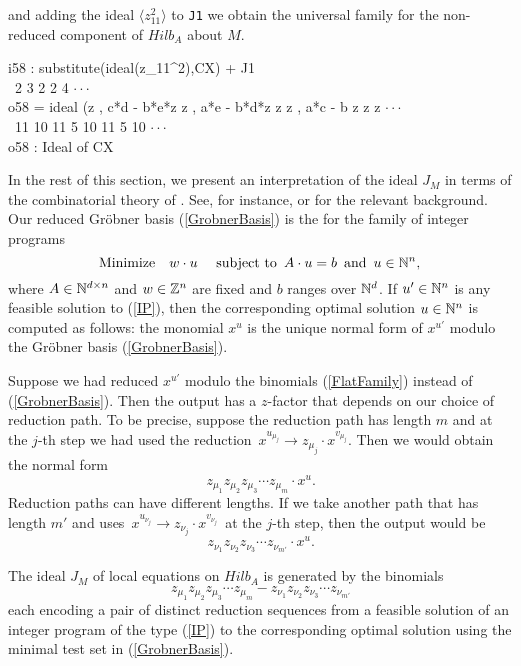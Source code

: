 \noindent and adding the ideal $\langle z_{11}^2 \rangle$ to {\tt J1} 
we obtain the universal family for the non-reduced component of
$Hilb_A$ about $M$. 

\beginOutput
i58 : substitute(ideal(z_11^2),CX) + J1\\
\emptyLine
\              2                                  3  2          2   4   $\cdot\cdot\cdot$\\
o58 = ideal (z  , c*d - b*e*z  z  , a*e - b*d*z z  z  , a*c - b z z  z $\cdot\cdot\cdot$\\
\              11             10 11             5 10 11           5 10  $\cdot\cdot\cdot$\\
\emptyLine
o58 : Ideal of CX\\
\endOutput

In the rest of this section, we present an interpretation of
the ideal $J_M$ in terms of the combinatorial theory
of {\it {}}. See, for instance, 
\cite[\S 4]{HS:St2} or \cite{HS:Tho} for 
the relevant background. Our reduced Gr\"obner basis 
(\ref{GrobnerBasis}) is the {\it {}} for
the family of integer programs
\begin{equation}
\label{IP}
{\rm Minimize} \quad
w \cdot u \,\,\quad
{\rm subject} \,\, {\rm to } \,\,\,
A \cdot u = b   \,\,\, {\rm and}
 \,\,\,u \in \mathbb{N}^n, 
\end{equation}
where $A \in \mathbb{N}^{d \times n}$ and $w
\in \mathbb{Z}^n$ are fixed and $b$ ranges over $\mathbb{N}^d$.
If $u' \in \mathbb{N}^n$ is any feasible solution
to (\ref{IP}), then the corresponding optimal solution
$u \in \mathbb{N}^n$ is computed as follows: the monomial
$x^u $ is the unique normal form of $x^{u'}$ modulo
the Gr\"obner basis (\ref{GrobnerBasis}).

Suppose we had reduced $x^{u'}$
modulo the binomials (\ref{FlatFamily}) instead of (\ref{GrobnerBasis}).
Then the output has a $z$-factor that depends on 
our choice of reduction path. To be precise, suppose the
reduction path has length $m$ and at the $j$-th step we had used the
reduction $\, x^{u_{\mu_j}} \rightarrow  z_{\mu_j} \cdot x^{v_{\mu_j}}
$. Then we would obtain the normal form
$$ \, z_{\mu_1} z_{\mu_2} z_{\mu_3} \cdots z_{\mu_m} \cdot x^u.$$
Reduction paths can have different lengths. If we take
another  path  that
has length $m'$ and  uses
$\, x^{u_{\nu_j}} \rightarrow  z_{\nu_j} \cdot x^{v_{\nu_j}} \,$
at the $j$-th step, then the output would be
$$ \, z_{\nu_1} z_{\nu_2} z_{\nu_3} \cdots z_{\nu_{m'}} \cdot x^u  .$$

\begin{theorem} \label{paths}
The ideal $J_M$ of local equations
on $Hilb_A$ is generated by the binomials
$$ \, z_{\mu_1} z_{\mu_2} z_{\mu_3} \cdots z_{\mu_m} - 
z_{\nu_1} z_{\nu_2} z_{\nu_3} \cdots z_{\nu_{m'}} $$ each encoding a
pair of distinct reduction sequences from a feasible solution of an
integer program of the type (\ref{IP}) to the corresponding optimal
solution using the minimal test set in (\ref{GrobnerBasis}).
\end{theorem}

